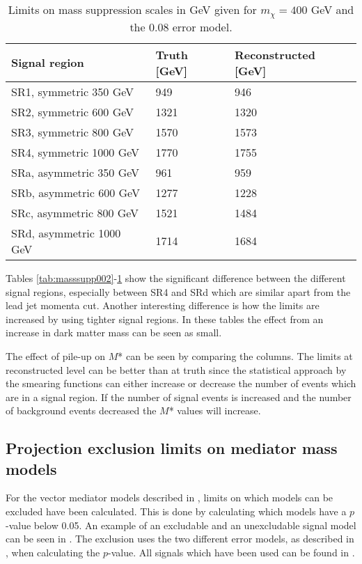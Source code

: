 \begin{table}[ht]
\begin{center}
\begin{tabular}{|l|l|l|}
\hline
Signal region & Truth [GeV]& Reconstructed [GeV]\\ \hline
SR1, symmetric 350 GeV&949&946\\
SR2, symmetric 600 GeV&1321&1320\\
SR3, symmetric 800 GeV&1570&1573\\
SR4, symmetric 1000 GeV&1770&1755\\ \hline

SRa, asymmetric 350 GeV&961&959\\
SRb, asymmetric 600 GeV&1277&1228\\
SRc, asymmetric 800 GeV&1521&1484\\
SRd, asymmetric 1000 GeV&1714&1684\\ \hline
\end{tabular}
\caption{Limits on mass suppression scales in GeV given for $m_{\chi}=400$ GeV and the 0.08 error model.}
\label{tab:masssupp2010}
\end{center}
\end{table}

Tables \ref{tab:masssupp002}-\ref{tab:masssupp2010} show the significant difference between the different signal regions, especially between SR4 and SRd which are similar apart from the lead jet momenta cut. Another interesting difference is how the limits are increased by using tighter signal regions. In these tables the effect from an increase in dark matter mass can be seen as small.

The effect of pile-up on $M$* can be seen by comparing the columns. The limits at reconstructed level can be better than at truth since the statistical approach by the smearing functions can either increase or decrease the number of events which are in a signal region. If the number of signal events is increased and the number of background events decreased the $M$* values will increase.

\subsection{Projection exclusion limits on mediator mass models}\label{sec:res:subsec:Mm}
For the vector mediator models described in , limits on which models can be excluded have been calculated. This is done by calculating which models have a $p$-value below 0.05. An example of an excludable and an unexcludable signal model can be seen in . The exclusion uses the two different error models, as described in , when calculating the $p$-value. All signals which have been used can be found in .

